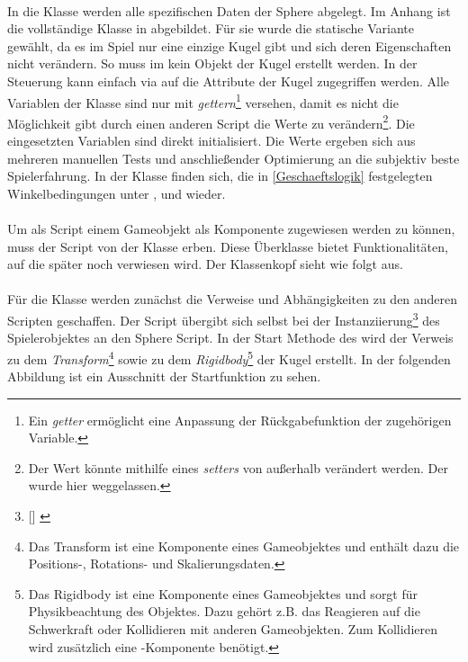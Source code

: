 \paragraph{}
In die Klasse  werden alle spezifischen Daten der Sphere abgelegt. Im Anhang ist die vollständige Klasse in  abgebildet. Für sie wurde die statische Variante gewählt, da es im Spiel nur eine einzige Kugel gibt und sich deren Eigenschaften nicht verändern. So muss im  kein Objekt der Kugel erstellt werden. In der Steuerung kann einfach via  auf die Attribute der Kugel zugegriffen werden. Alle Variablen der  Klasse sind nur mit \textit{gettern}\footnote{Ein \textit{getter} ermöglicht eine Anpassung der Rückgabefunktion der zugehörigen Variable.} versehen, damit es nicht die Möglichkeit gibt durch einen anderen Script die Werte zu verändern\footnote{Der Wert könnte mithilfe eines \textit{setters} von außerhalb verändert werden. Der wurde hier weggelassen.}. Die eingesetzten Variablen sind direkt initialisiert. Die Werte ergeben sich aus mehreren manuellen Tests und anschließender Optimierung an die subjektiv beste Spielerfahrung. In der Klasse finden sich, die in \autoref{Geschaeftslogik}  festgelegten Winkelbedingungen unter ,  und  wieder. 
\paragraph{}
Um als Script einem Gameobjekt als Komponente zugewiesen werden zu können, muss der Script von der Klasse  erben. Diese Überklasse bietet Funktionalitäten, auf die später noch verwiesen wird. Der Klassenkopf sieht wie folgt aus.



\paragraph{}
Für die  Klasse werden zunächst die Verweise und Abhängigkeiten zu den anderen Scripten geschaffen. Der  Script übergibt sich selbst bei der Instanziierung\footnote{ [] \cite{Instanziierung} } des Spielerobjektes an den Sphere Script. In  der Start Methode des  wird der Verweis zu dem \textit{Transform}\footnote{Das Transform ist eine Komponente eines Gameobjektes und enthält dazu die Positions-, Rotations- und Skalierungsdaten. } sowie zu dem \textit{Rigidbody}\footnote{Das Rigidbody ist eine Komponente eines Gameobjektes und sorgt für Physikbeachtung des Objektes. Dazu gehört z.B. das Reagieren auf die Schwerkraft oder Kollidieren mit anderen Gameobjekten. Zum Kollidieren wird zusätzlich eine -Komponente benötigt.} der Kugel erstellt. In der folgenden Abbildung ist ein Ausschnitt der Startfunktion zu sehen.

